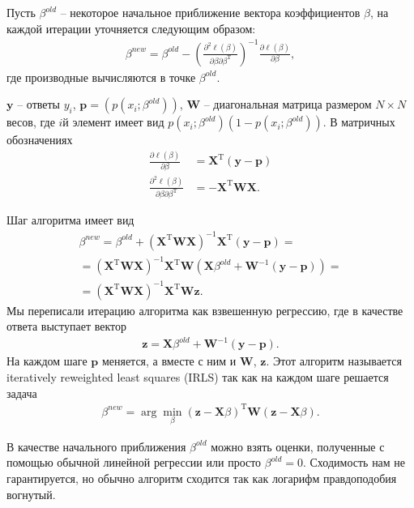 \documentclass[12pt]{article}
\begin{document}
	Пусть $\beta^{old}$ -- некоторое начальное приближение вектора коэффициентов $\beta$, на каждой итерации уточняется следующим образом:
	\begin{align*}
		\beta^{new} = \beta^{old} - \left(\frac{\partial^2 \ell(\beta)}{\partial \beta \partial \beta^{\mathrm{T}}}\right)^{-1}\frac{\partial \ell(\beta)}{\partial \beta},
	\end{align*}
	где производные вычисляются в точке $\beta^{old}$.
	
	$\mathbf{y}$ -- ответы $y_i$, $\mathbf{p} = (p(x_i; \beta^{old}))$, $\mathbf{W}$ -- диагональная матрица размером $N\times N$ весов, где $i$й элемент имеет вид $p(x_i;\beta^{old})(1 - p(x_i; \beta^{old}))$. В матричных обозначениях
	\begin{align*}
		\frac{\partial \ell(\beta)}{\partial \beta} &= \mathbf{X}^\mathrm{T}(\mathbf{y} - \mathbf{p})\\
		\frac{\partial^2 \ell(\beta)}{\partial \beta \partial \beta^{\mathrm{T}}} &= -\mathbf{X}^\mathrm{T}\mathbf{W}\mathbf{X}.
	\end{align*}

	Шаг алгоритма имеет вид
	\begin{multline*}
		\beta^{new} = \beta^{old} + (\mathbf{X}^\mathrm{T}\mathbf{W}\mathbf{X})^{-1}\mathbf{X}^\mathrm{T}(\mathbf{y} - \mathbf{p}) = \\
		= (\mathbf{X}^\mathrm{T}\mathbf{W}\mathbf{X})^{-1}\mathbf{X}^\mathrm{T}\mathbf{W} (\mathbf{X}\beta^{old} + \mathbf{W}^{-1}(\mathbf{y} - \mathbf{p})) = \\
		= (\mathbf{X}^\mathrm{T}\mathbf{W}\mathbf{X})^{-1}\mathbf{X}^\mathrm{T}\mathbf{W}\mathbf{z}.
	\end{multline*}
	Мы переписали итерацию алгоритма как взвешенную регрессию, где в качестве ответа выступает вектор
	\begin{align*}
		\mathbf{z} = \mathbf{X}\beta^{old} + \mathbf{W}^{-1}(\mathbf{y} - \mathbf{p}).
	\end{align*}
	На каждом шаге $\mathbf{p}$ меняется, а вместе с ним и $\mathbf{W}$, $\mathbf{z}$. Этот алгоритм называется iteratively reweighted least squares (IRLS) так как на каждом шаге решается задача
	\begin{align*}
		\beta^{new} = \arg \min_\beta (\mathbf{z} - \mathbf{X}\beta)^\mathrm{T} \mathbf{W}(\mathbf{z} - \mathbf{X}\beta).
	\end{align*}
	
	В качестве начального приближения $\beta^{old}$ можно взять оценки, полученные с помощью обычной линейной регрессии или просто $\beta^{old} = 0$. Сходимость нам не гарантируется, но обычно алгоритм сходится так как логарифм правдоподобия вогнутый.
	
\end{document}
